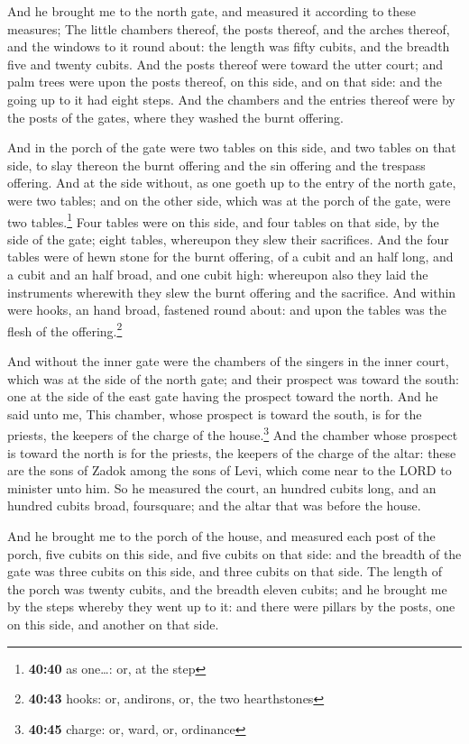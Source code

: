  And he brought me to the north gate, and measured it
according to these measures;  The little chambers
thereof, the posts thereof, and the arches thereof, and the windows to
it round about: the length was fifty cubits, and the breadth five and
twenty cubits.  And the posts thereof were toward the
utter court; and palm trees were upon the posts thereof, on this side,
and on that side: and the going up to it had eight steps.
 And the chambers and the entries thereof were by the
posts of the gates, where they washed the burnt offering.

 And in the porch of the gate were two tables on this
side, and two tables on that side, to slay thereon the burnt offering
and the sin offering and the trespass offering.  And at
the side without, as one goeth up to the entry of the north gate, were
two tables; and on the other side, which was at the porch of the gate,
were two tables.\footnote{\textbf{40:40} as one\ldots: or, at the step}
 Four tables were on this side, and four tables on that
side, by the side of the gate; eight tables, whereupon they slew their
sacrifices.  And the four tables were of hewn stone for
the burnt offering, of a cubit and an half long, and a cubit and an half
broad, and one cubit high: whereupon also they laid the instruments
wherewith they slew the burnt offering and the sacrifice.
 And within were hooks, an hand broad, fastened round
about: and upon the tables was the flesh of the offering.\footnote{\textbf{40:43}
  hooks: or, andirons, or, the two hearthstones}

 And without the inner gate were the chambers of the
singers in the inner court, which was at the side of the north gate; and
their prospect was toward the south: one at the side of the east gate
having the prospect toward the north.  And he said unto
me, This chamber, whose prospect is toward the south, is for the
priests, the keepers of the charge of the house.\footnote{\textbf{40:45}
  charge: or, ward, or, ordinance}  And the chamber whose
prospect is toward the north is for the priests, the keepers of the
charge of the altar: these are the sons of Zadok among the sons of Levi,
which come near to the LORD to minister unto him.  So he
measured the court, an hundred cubits long, and an hundred cubits broad,
foursquare; and the altar that was before the house.

 And he brought me to the porch of the house, and
measured each post of the porch, five cubits on this side, and five
cubits on that side: and the breadth of the gate was three cubits on
this side, and three cubits on that side.  The length of
the porch was twenty cubits, and the breadth eleven cubits; and he
brought me by the steps whereby they went up to it: and there were
pillars by the posts, one on this side, and another on that side.

